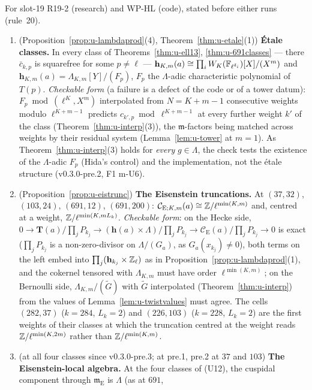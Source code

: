 \documentclass[11pt]{article}
\newcommand{\Iw}{\Lambda}                         %
\newcommand{\hcusp}{\mathbf{h}}                   %
\newcommand{\Tu}{\mathbf{T}}                      %
\newcommand{\Pk}[1]{P_{#1}}                       %
\newcommand{\Eis}{\mathrm{E}}
\newcommand{\Cg}{\mathcal{C}}                     %
\newcommand{\Zl}{\Z_\ell}
\begin{document}
\begin{prediction}\label{pr:u-lambda}
For slot-19 R19-2 (research) and WP-HL (code), stated before either runs (rule~20).
\begin{enumerate}
\item[(U11)] \PROVED{} (Proposition~\ref{prop:u-lambdaprod}(4), Theorem~\ref{thm:u-etale}(1)) \textbf{Étale classes.} In every class of Theorems~\ref{thm:u-ell13},
  \ref{thm:u-691classes} --- there $\bar c_{k,p}$ is squarefree for some $p\ne\ell$ --- $\hcusp_{K,m}(a)\cong\prod_iW_K(\F_{\ell^{\delta_i}})[X]/(X^{m})$ and
  $\hcusp_{K,m}(a)=\Iw_{K,m}[Y]/(F_p)$, $F_p$ the $\Iw$-adic characteristic polynomial of $T(p)$. \emph{Checkable form} (a failure is a defect of the code or of a tower datum): $F_p\bmod(\ell^{K},X^{m})$
  interpolated from $N=K+m-1$ consecutive weights modulo $\ell^{K+m-1}$ predicts $c_{k',p}\bmod\ell^{K+m-1}$ at every further weight $k'$ of the class
  (Theorem~\ref{thm:u-interp}(3)), the $\mathfrak m$-factors being matched across weights by their residual system (Lemma~\ref{lem:u-tower} at $m=1$). As
  Theorem~\ref{thm:u-interp}(3) holds for \emph{every} $g\in\Iw$, the check tests the existence of the $\Iw$-adic $F_p$ (Hida's control) and the implementation, not the
  étale structure (v0.3.0-pre.2, F1 m-U6).
\item[(U12)] \PROVED{} (Proposition~\ref{prop:u-eistrunc}) \textbf{The Eisenstein truncations.} At $(37,32)$, $(103,24)$, $(691,12)$, $(691,200)$:
  $\Cg_{\Eis;K,m}(a)\cong\Z/\ell^{\min(K,m)}$ and, centred at a weight, $\mathbb{Z}/\ell^{\min(K,mL_k)}$. \emph{Checkable form}: on the Hecke side,
  $0\to\Tu(a)/\textstyle\prod_j\Pk{k_j}\to(\hcusp(a)\times\Iw)/\prod_j\Pk{k_j}\to\Cg_\Eis(a)/\prod_j\Pk{k_j}\to0$ is exact ($\prod_j\Pk{k_j}$ is a non-zero-divisor on
  $\Iw/(G_a)$, as $G_a(x_{k_j})\ne0$), both terms on the left embed into $\prod_j(\hcusp_{k_j}\times\Zl)$ as in Proposition~\ref{prop:u-lambdaprod}(1), and the cokernel
  tensored with $\Iw_{K,m}$ must have order $\ell^{\min(K,m)}$; on the Bernoulli side, $\Iw_{K,m}/(\tilde G)$ with $\tilde G$ interpolated (Theorem~\ref{thm:u-interp}) from
  the values of Lemma~\ref{lem:u-twistvalues} must agree. The cells $(282,37)$ ($k=284$, $L_k=2$) and $(226,103)$ ($k=228$, $L_k=2$) are the first weights of
  their classes at which the truncation centred at the weight reads $\mathbb{Z}/\ell^{\min(K,2m)}$ rather than $\mathbb{Z}/\ell^{\min(K,m)}$.
\item[(U13)] \PROVED{} (at all four classes since v0.3.0-pre.3; at pre.1, pre.2 \CONJ{} at $37$ and $103$) \textbf{The Eisenstein-local algebra.} At the four classes of (U12), the cuspidal component through $\mathfrak m_\Eis$ is $\Iw$ (as \PROVED{} at $691$,

\end{enumerate}
\end{prediction}
\end{document}
